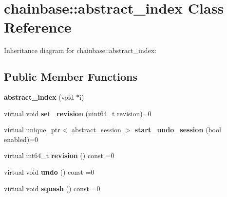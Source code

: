 \hypertarget{classchainbase_1_1abstract__index}{}\section{chainbase\+:\+:abstract\+\_\+index Class Reference}
\label{classchainbase_1_1abstract__index}


Inheritance diagram for chainbase\+:\+:abstract\+\_\+index\+:
\subsection*{Public Member Functions}
\begin{DoxyCompactItemize}
\item 
\mbox{\label{classchainbase_1_1abstract__index_ab87f0755ea957145b06a0b6fd7211932}} 
{\bfseries abstract\+\_\+index} (void $\ast$i)
\item 
\mbox{\label{classchainbase_1_1abstract__index_afbbf53c11335ab092f9ae9ad61ab4713}} 
virtual void {\bfseries set\+\_\+revision} (uint64\+\_\+t revision)=0
\item 
\mbox{\label{classchainbase_1_1abstract__index_a3365b9f23948951a4f863ca34d1c2b1f}} 
virtual unique\+\_\+ptr$<$ \mbox{\hyperlink{classchainbase_1_1abstract__session}{abstract\+\_\+session}} $>$ {\bfseries start\+\_\+undo\+\_\+session} (bool enabled)=0
\item 
\mbox{\label{classchainbase_1_1abstract__index_a5d516edfe41f7652301047157ae9637a}} 
virtual int64\+\_\+t {\bfseries revision} () const =0
\item 
\mbox{\label{classchainbase_1_1abstract__index_a71f1306a939617ecf6e12998f611de41}} 
virtual void {\bfseries undo} () const =0
\item 
\mbox{\label{classchainbase_1_1abstract__index_ab3da2a8b3f20754bfb48fe69e7e54022}} 
virtual void {\bfseries squash} () const =0
\item 
\mbox{\label{classchainbase_1_1abstract__index_a14f76f6b884e87e5cd99ba10e0dcd1ec}} 

\end{DoxyCompactItemize}
